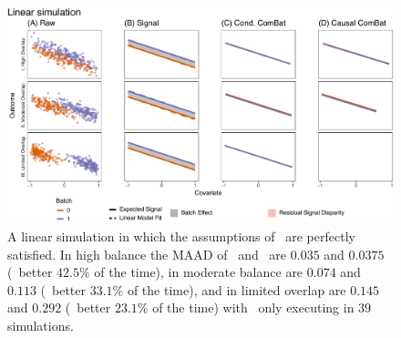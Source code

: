 {{{{\begin{figure}[h]
    \centering
    \includegraphics[width=\linewidth]{Figures/Supplement/Simulations/sim_lin_adjust.pdf}
    \caption{A linear simulation in which the assumptions of \ccombat~are perfectly satisfied. In high balance the MAAD of \ccombat~and \cccombat~are $0.035$ and $0.0375$ (\cccombat~better $42.5\%$ of the time), in moderate balance are $0.074$ and $0.113$ (\cccombat~better $33.1\%$ of the time), and in limited overlap are $0.145$ and $0.292$ (\cccombat~better $23.1\%$ of the time) with \cccombat~only executing in $39$ simulations.}
    \label{fig:sim_lin_adjust}
\end{figure}

}}}}
